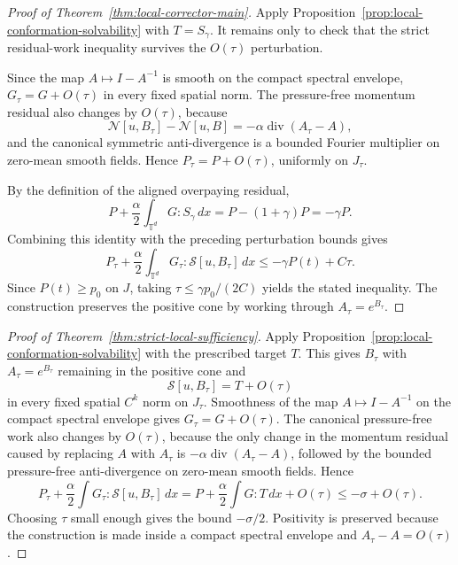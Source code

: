 \documentclass[11pt]{article}
\numberwithin{equation}{section}
\newcommand{\T}{\mathbb T}
\newcommand{\divv}{\operatorname{div}}
\newcommand{\calN}{\mathcal N}
\begin{document}
\begin{proof}[Proof of Theorem~\ref{thm:local-corrector-main}]
Apply Proposition~\ref{prop:local-conformation-solvability} with
$T=S_\gamma$.  It remains only to check that the strict residual-work
inequality survives the $O(\tau)$ perturbation.

Since the map $A\mapsto I-A^{-1}$ is smooth on the compact spectral envelope,
$G_\tau=G+O(\tau)$ in every fixed spatial norm.  The pressure-free momentum
residual also changes by $O(\tau)$, because
\[
  \calN[u,B_\tau]-\calN[u,B]
  =-\alpha\divv(A_\tau-A),
\]
and the canonical symmetric anti-divergence is a bounded Fourier multiplier on
zero-mean smooth fields.  Hence $P_\tau=P+O(\tau)$, uniformly on $J_\tau$.

By the definition of the aligned overpaying residual,
\[
  P+\frac{\alpha}{2}\int_{\T^d}G:S_\gamma\,dx
  =P-(1+\gamma)P
  =-\gamma P .
\]
Combining this identity with the preceding perturbation bounds gives
\[
  P_\tau+\frac{\alpha}{2}
  \int_{\T^d}G_\tau:\mathcal S[u,B_\tau]\,dx
  \le -\gamma P(t)+C\tau .
\]
Since $P(t)\ge p_0$ on $J$, taking $\tau\le\gamma p_0/(2C)$ yields the stated
inequality.  The construction preserves the positive cone by working through
$A_\tau=e^{B_\tau}$.
\end{proof}

\begin{proof}[Proof of Theorem~\ref{thm:strict-local-sufficiency}]
Apply Proposition~\ref{prop:local-conformation-solvability} with the prescribed
target \(T\).  This gives \(B_\tau\) with \(A_\tau=e^{B_\tau}\) remaining in the
positive cone and
\[
  \mathcal S[u,B_\tau]=T+O(\tau)
\]
in every fixed spatial \(C^k\) norm on \(J_\tau\).  Smoothness of the map
\(A\mapsto I-A^{-1}\) on the compact spectral envelope gives
\(G_\tau=G+O(\tau)\).  The canonical pressure-free work also changes by
\(O(\tau)\), because the only change in the momentum residual caused by replacing
\(A\) with \(A_\tau\) is \(-\alpha\operatorname{div}(A_\tau-A)\), followed by the
bounded pressure-free anti-divergence on zero-mean smooth fields.  Hence
\[
  P_\tau+\frac{\alpha}{2}\int G_\tau:\mathcal S[u,B_\tau] \,dx
  =
  P+\frac{\alpha}{2}\int G:T\,dx+O(\tau)
  \le -\sigma+O(\tau).
\]
Choosing \(\tau\) small enough gives the bound \(-\sigma/2\).  Positivity is
preserved because the construction is made inside a compact spectral envelope
and \(A_\tau-A=O(\tau)\).
\end{proof}
\end{document}
